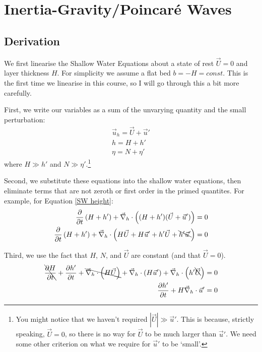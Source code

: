 \section{Inertia-Gravity/Poincaré Waves}

\subsection{Derivation}

We first linearise the Shallow Water Equations about a state of rest $\vec{U}=0$ and layer thickness $H$. For simplicity we assume a flat bed $b=-H=const$. This is the first time we linearise in this course, so I will go through this a bit more carefully.

First, we write our variables as a sum of the unvarying quantity and the small perturbation:
\begin{align*}
    \vec{u}_h=\vec{U}+\vec{u}'\\
    h = H + h'\\
    \eta = N + \eta'
\end{align*}
where $H\gg h'$ and $N\gg \eta'$.\footnote{
    You might notice that we haven't required $|\vec{U}|\gg \vec{u}'$. This is because, strictly speaking, $\vec{U}=0$, so there is no way for $\vec{U}$ to be much larger than $\vec{u}'$. We need some other criterion on what we require for $\vec{u}'$ to be `small'.
}

Second, we substitute these equations into the shallow water equations, then eliminate terms that are not zeroth or first order in the primed quantites. For example, for Equation \ref{SW height}:
\begin{align*}
    \frac{\partial}{\partial t}\left( H+h' \right)+\vec{\nabla}_h\cdot \left( (H+h')(\vec{U}+\vec{u}') \right)=0\\
    \frac{\partial}{\partial t}\left( H+h' \right)+\vec{\nabla}_h\cdot \left( H\vec{U}+H\vec{u}'+h'\vec{U}+\bcancel{h'\vec{u}'} \right)=0
\end{align*}

Third, we use the fact that $H$, $N$, and $\vec{U}$ are constant (and that $\vec{U}=0$).
\begin{align*}
    \bcancel{\frac{\partial H}{\partial t}}+ \frac{\partial h'}{\partial t}+\bcancel{\vec{\nabla}_h\cdot \left( H\vec{U} \right)}+\vec{\nabla}_h\cdot \left(H\vec{u}'\right)+\vec{\nabla}_h\cdot \left(h'\bcancel{\vec{U}} \right)=0\\
    \frac{\partial h'}{\partial t}+H\vec{\nabla}_h\cdot\vec{u}'=0
\end{align*}

